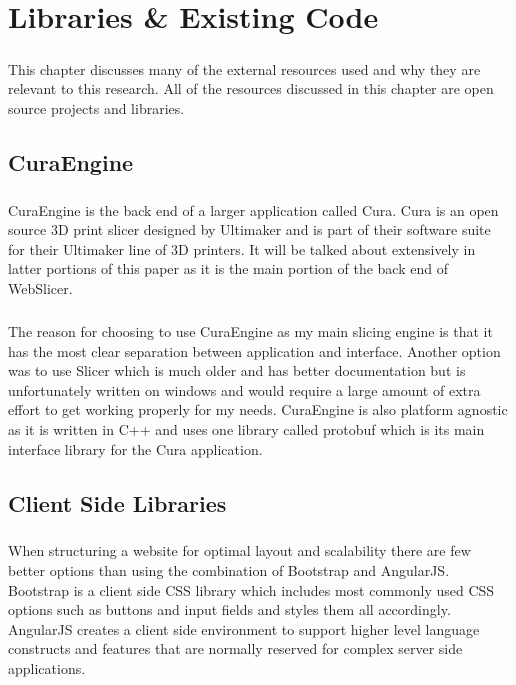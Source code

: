 \chapter{Libraries \& Existing Code}
\paragraph{}
This chapter discusses many of the external resources used and why they are relevant to this research. All of the resources discussed in this chapter are open source projects and libraries.

\section{CuraEngine}
\paragraph{}
CuraEngine is the back end of a larger application called Cura.
Cura is an open source 3D print slicer designed by Ultimaker and is part of their software suite for their Ultimaker line of 3D printers.
It will be talked about extensively in latter portions of this paper as it is the main portion of the back end of WebSlicer.

\paragraph{}
The reason for choosing to use CuraEngine as my main slicing engine is that it has the most clear separation between application and interface.
Another option was to use Slicer which is much older and has better documentation but is unfortunately written on windows and would require a large amount of extra effort to get working properly for my needs.
CuraEngine is also platform agnostic as it is written in C++ and uses one library called protobuf which is its main interface library for the Cura application.

\section{Client Side Libraries}
\paragraph{}
When structuring a website for optimal layout and scalability there are few better options than using the combination of Bootstrap and AngularJS.
Bootstrap is a client side CSS library which includes most commonly used CSS options such as buttons and input fields and styles them all accordingly.
AngularJS creates a client side environment to support higher level language constructs and features that are normally reserved for complex server side applications.

